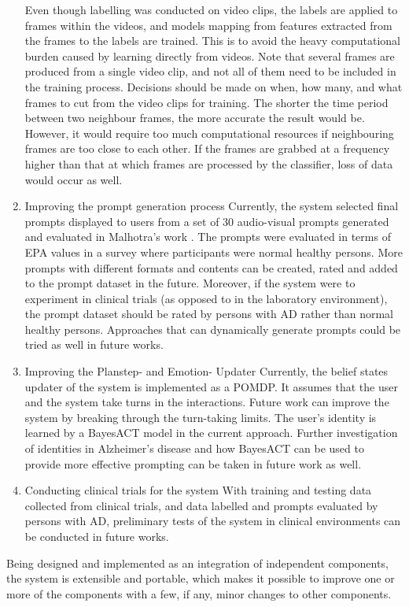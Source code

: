 \begin{enumerate}
Even though labelling was conducted on video clips, the labels are applied to frames within the videos, and models mapping from features extracted from the frames to the labels are trained. This is to avoid the heavy computational burden caused by learning directly from videos. Note that several frames are produced from a single video clip, and not all of them need to be included in the training process. Decisions should be made on when, how many, and what frames to cut from the video clips for training. The shorter the time period between two neighbour frames, the more accurate the result would be. However, it would require too much computational resources if neighbouring frames are too close to each other. If the frames are grabbed at a frequency higher than that at which frames are processed by the classifier, loss of data would occur as well.

\item{Improving the prompt generation process}
Currently, the system selected final prompts displayed to users from a set of 30 audio-visual prompts generated and evaluated in Malhotra's work \cite{malhotra2014}. The prompts were evaluated in terms of EPA values in a survey where participants were normal healthy persons. More prompts with different formats and contents can be created, rated and added to the prompt dataset in the future. Moreover, if the system were to experiment in clinical trials (as opposed to in the laboratory environment), the prompt dataset should be rated by persons with AD rather than normal healthy persons. Approaches that can dynamically generate prompts could be tried as well in future works.

\item{Improving the Planstep- and Emotion- Updater}
Currently, the belief states updater of the system is implemented as a POMDP. It assumes that the user and the system take turns in the interactions. Future work can improve the system by breaking through the turn-taking limits. The user's identity is learned by a BayesACT model in the current approach. Further investigation of identities in Alzheimer's disease and how BayesACT can be used to provide more effective prompting can be taken in future work as well.

\item{Conducting clinical trials for the system}
With training and testing data collected from clinical trials, and data labelled and prompts evaluated by persons with AD, preliminary tests of the system in clinical environments can be conducted in future works.

\end{enumerate}

Being designed and implemented as an integration of independent components, the system is extensible and portable, which makes it possible to improve one or more of the components with a few, if any, minor changes to other components.

